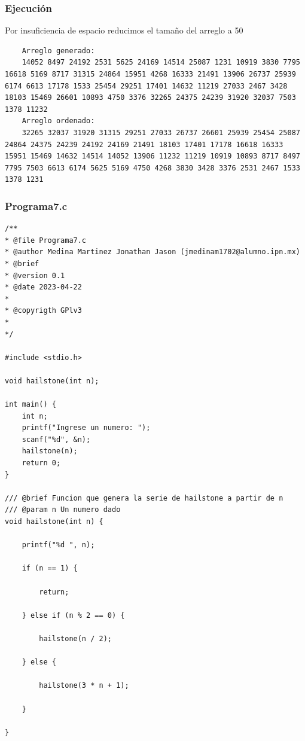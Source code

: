 \documentclass{article}
\begin{document}
	\subsubsection{Ejecución}
	
	Por insuficiencia de espacio reducimos el tamaño del arreglo a 50
	
	\begin{lstlisting}
	Arreglo generado:
	14052 8497 24192 2531 5625 24169 14514 25087 1231 10919 3830 7795 16618 5169 8717 31315 24864 15951 4268 16333 21491 13906 26737 25939 6174 6613 17178 1533 25454 29251 17401 14632 11219 27033 2467 3428 18103 15469 26601 10893 4750 3376 32265 24375 24239 31920 32037 7503 1378 11232
	Arreglo ordenado:
	32265 32037 31920 31315 29251 27033 26737 26601 25939 25454 25087 24864 24375 24239 24192 24169 21491 18103 17401 17178 16618 16333 15951 15469 14632 14514 14052 13906 11232 11219 10919 10893 8717 8497 7795 7503 6613 6174 5625 5169 4750 4268 3830 3428 3376 2531 2467 1533 1378 1231
	\end{lstlisting}
	
	\newpage
	
	\subsubsection{Programa7.c}
	
	\begin{lstlisting}
/**
* @file Programa7.c
* @author Medina Martinez Jonathan Jason (jmedinam1702@alumno.ipn.mx)
* @brief 
* @version 0.1
* @date 2023-04-22
* 
* @copyrigth GPlv3
* 
*/

#include <stdio.h>

void hailstone(int n);

int main() {
	int n;
	printf("Ingrese un numero: ");
	scanf("%d", &n);
	hailstone(n);
	return 0;
}

/// @brief Funcion que genera la serie de hailstone a partir de n
/// @param n Un numero dado
void hailstone(int n) {
	
	printf("%d ", n);
	
	if (n == 1) {
		
		return;
		
	} else if (n % 2 == 0) {
		
		hailstone(n / 2);
		
	} else {
		
		hailstone(3 * n + 1);
		
	}
	
}

	\end{lstlisting}
	
\end{document}
